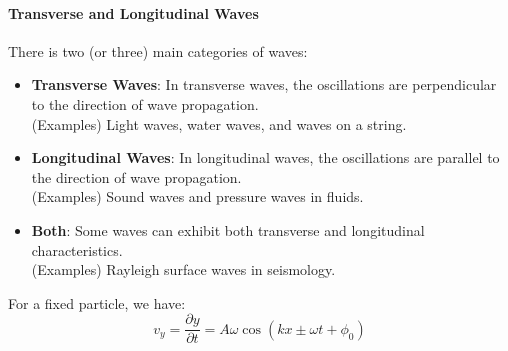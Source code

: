 \documentclass[11pt]{report}
\begin{document}
\paragraph{Transverse and Longitudinal Waves} There is two (or three) main categories of waves:
\begin{itemize}
    \item \textbf{Transverse Waves}: In transverse waves, the oscillations are perpendicular to the direction of wave propagation. \\
    (Examples) Light waves, water waves, and waves on a string.
    \item \textbf{Longitudinal Waves}: In longitudinal waves, the oscillations are parallel to the direction of wave propagation. \\
    (Examples) Sound waves and pressure waves in fluids.
    \item \textbf{Both}: Some waves can exhibit both transverse and longitudinal characteristics. \\
    (Examples) Rayleigh surface waves in seismology.
\end{itemize}
\begin{definition}
    For a fixed particle, we have:
    $$
        v_y = \frac{\partial y}{\partial t} = A \omega \cos(kx \pm \omega t + \phi_0)
    $$
\end{definition}
\end{document}
